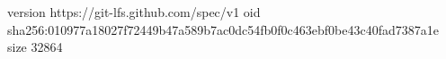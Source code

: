 version https://git-lfs.github.com/spec/v1
oid sha256:010977a18027f72449b47a589b7ac0dc54fb0f0c463ebf0be43c40fad7387a1e
size 32864
